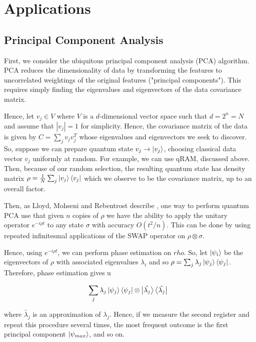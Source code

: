 \documentclass[main.tex]{subfiles}
\begin{document}
\section{Applications}

\subsection{Principal Component Analysis}

First, we consider the ubiquitous principal component analysis (PCA) algorithm. PCA reduces the dimensionality of data by transforming the features to uncorrelated weightings of the original features ("principal components"). This requires simply finding the eigenvalues and eigenvectors of the data covariance matrix. 

Hence, let $v_j \in V$ where $V$ is a $d$-dimensional vector space such that $d=2^n=N$ and assume that $|v_j| = 1$ for simplicity. Hence, the covariance matrix of the data is given by $C = \sum_j v_jv_j^T$ whose eigenvalues and eigenvectors we seek to discover. So, suppose we can prepare quantum state $v_j \rightarrow \ket{v_j}$, choosing classical data vector $v_j$ uniformly at random. For example, we can use qRAM, discussed above. Then, because of our random selection, the resulting quantum state has density matrix $\rho = \frac{1}{N} \sum_j \ket{v_j}\bra{v_j}$ which we observe to be the covariance matrix, up to an overall factor. 

Then, as Lloyd, Mohseni and Rebentrost describe \cite{lloyd2014quantum}, one way to perform quantum PCA use that given $n$ copies of $\rho$ we have the ability to apply the unitary operator $e^{-i\rho t}$ to any state $\sigma$ with accuracy $O(t^2 / n)$. This can be done by using repeated infinitesmal applications of the SWAP operator on $\rho \otimes \sigma$. 

Hence, using $e^{-i \rho t}$, we can perform phase estimation on $rho$. So, let $\ket{\psi_i}$ be the eigenvectors of $\rho$ with associated eigenvalues $\lambda_i$ and so $\rho = \sum_j \lambda_j \ket{\psi_j}\bra{\psi_j}$. Therefore, phase estimation gives u

\begin{align*}
\sum_j \lambda_j \ket{\psi_j}\bra{\psi_j} \otimes \ket{\tilde{\lambda_j}} \bra{\tilde{\lambda_j}}
\end{align*}

where $\tilde{\lambda_j}$ is an approximation of $\lambda_j$. Hence, if we measure the second register and repeat this procedure several times, the most frequent outcome is the first principal component $\ket{\psi_{max}}$, and so on.
\end{document}
